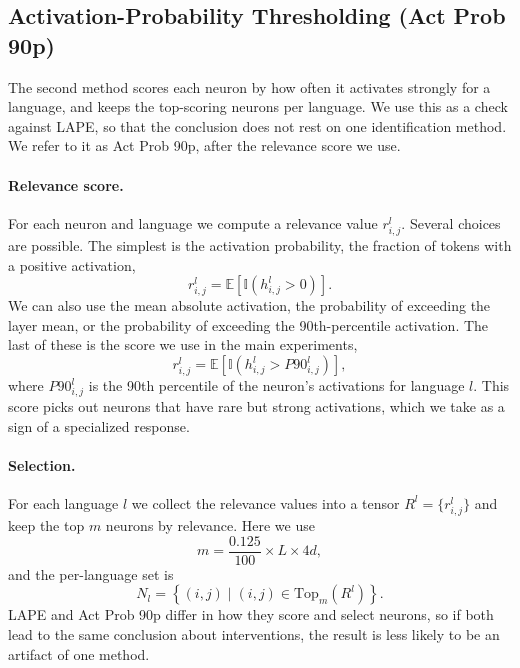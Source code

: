 \subsection{Activation-Probability Thresholding (Act Prob 90p)}
\label{subsec:neurons-actprob}

The second method scores each neuron by how often it activates strongly for a
language, and keeps the top-scoring neurons per language. We use this as a check
against LAPE, so that the conclusion does not rest on one identification method.
We refer to it as Act Prob 90p, after the relevance score we use.

\paragraph{Relevance score.}
For each neuron and language we compute a relevance value $r^{l}_{i,j}$. Several
choices are possible. The simplest is the activation probability, the fraction of
tokens with a positive activation,
\begin{equation}
	r^{l}_{i,j} = \mathbb{E}\left[ \mathbb{I}\!\left( h^{l}_{i,j} > 0 \right) \right].
	\label{eq:neurons-act-zero}
\end{equation}
We can also use the mean absolute activation, the probability of exceeding the
layer mean, or the probability of exceeding the 90th-percentile activation. The
last of these is the score we use in the main experiments,
\begin{equation}
	r^{l}_{i,j} = \mathbb{E}\left[ \mathbb{I}\!\left( h^{l}_{i,j} > P90^{l}_{i,j} \right) \right],
	\label{eq:neurons-act-90p}
\end{equation}
where $P90^{l}_{i,j}$ is the 90th percentile of the neuron's activations for
language $l$. This score picks out neurons that have rare but strong activations,
which we take as a sign of a specialized response.

\paragraph{Selection.}
For each language $l$ we collect the relevance values into a tensor
$R^{l} = \{ r^{l}_{i,j} \}$ and keep the top $m$ neurons by relevance. Here we use
\begin{equation}
	m = \frac{0.125}{100} \times L \times 4d,
	\label{eq:neurons-act-m}
\end{equation}
and the per-language set is
\begin{equation}
	N_l = \left\{ (i,j) \mid (i,j) \in \mathrm{Top}_m(R^{l}) \right\}.
	\label{eq:neurons-act-set}
\end{equation}
LAPE and Act Prob 90p differ in how they score and select neurons, so if both lead
to the same conclusion about interventions, the result is less likely to be an
artifact of one method.

